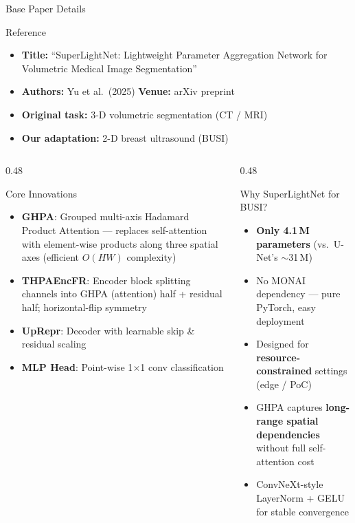 \documentclass[aspectratio=169,10pt]{beamer}
\begin{document}
\begin{frame}{Base Paper Details}
  \begin{block}{Reference \cite{yu2025superlightnet}}
    \begin{itemize}
      \item \textbf{Title:} ``SuperLightNet: Lightweight Parameter Aggregation
            Network for Volumetric Medical Image Segmentation''
      \item \textbf{Authors:} Yu et al.\ (2025) \quad
            \textbf{Venue:} arXiv preprint
      \item \textbf{Original task:} 3-D volumetric segmentation (CT / MRI)
      \item \textbf{Our adaptation:} 2-D breast ultrasound (BUSI)
    \end{itemize}
  \end{block}
  \vspace{2pt}
  \begin{columns}[T]
    \begin{column}{0.48\textwidth}
      \begin{block}{Core Innovations}
        \begin{itemize}
          \item \textbf{GHPA}: Grouped multi-axis Hadamard Product Attention
                --- replaces self-attention with element-wise products along
                three spatial axes (efficient $O(HW)$ complexity)
          \item \textbf{THPAEncFR}: Encoder block splitting channels into
                GHPA (attention) half + residual half; horizontal-flip symmetry
          \item \textbf{UpRepr}: Decoder with learnable skip \& residual scaling
          \item \textbf{MLP Head}: Point-wise 1$\times$1 conv classification
        \end{itemize}
      \end{block}
    \end{column}
    \begin{column}{0.48\textwidth}
      \begin{alertblock}{Why SuperLightNet for BUSI?}
        \begin{itemize}
          \item \textbf{Only 4.1\,M parameters} (vs.\ U-Net's $\sim$31\,M)
          \item No MONAI dependency --- pure PyTorch, easy deployment
          \item Designed for \textbf{resource-constrained} settings (edge / PoC)
          \item GHPA captures \textbf{long-range spatial dependencies}
                without full self-attention cost
          \item ConvNeXt-style LayerNorm + GELU for stable convergence
        \end{itemize}
      \end{alertblock}
    \end{column}
  \end{columns}
\end{frame}
\end{document}
